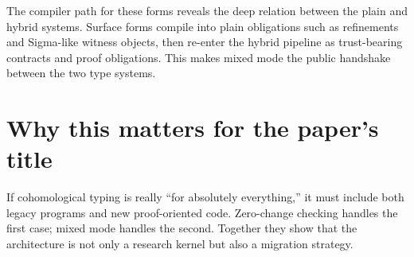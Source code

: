 The compiler path for these forms reveals the deep relation between the plain and hybrid
systems. Surface forms compile into plain obligations such as refinements and Sigma-like
witness objects, then re-enter the hybrid pipeline as trust-bearing contracts and proof
obligations. This makes mixed mode the public handshake between the two type systems.

\section*{Why this matters for the paper's title}
If cohomological typing is really ``for absolutely everything,'' it must include both
legacy programs and new proof-oriented code. Zero-change checking handles the first case;
mixed mode handles the second. Together they show that the architecture is not only a
research kernel but also a migration strategy.

